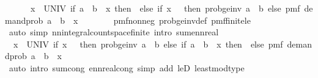 \begin{isabellebody}
\ \ \ \ \ \ {\isacharparenleft}{\kern0pt}{\isasymSum}x\ {\isasymin}\ UNIV{\isachardot}{\kern0pt}\ {\isacharparenleft}{\kern0pt}if\ a\ {\isacharplus}{\kern0pt}\ b\ {\isacharless}{\kern0pt}\ x\ then\ {}\ else\ if\ x\ {\isacharequal}{\kern0pt}\ {}\ then\ prob{\isacharunderscore}{\kern0pt}ge{\isacharunderscore}{\kern0pt}inv\ {\isacharparenleft}{\kern0pt}a\ {\isacharplus}{\kern0pt}\ b{\isacharparenright}{\kern0pt}\ else\ pmf\ demand{\isacharunderscore}{\kern0pt}prob\ {\isacharparenleft}{\kern0pt}a\ {\isacharplus}{\kern0pt}\ b\ {\isacharminus}{\kern0pt}\ x{\isacharparenright}{\kern0pt}{\isacharparenright}{\kern0pt}{\isacharparenright}{\kern0pt}{\isachardoublequoteclose}\isanewline
\ \ \ \ \ \ \isamarkupfalse%
\ pmf{\isacharunderscore}{\kern0pt}nonneg\ prob{\isacharunderscore}{\kern0pt}ge{\isacharunderscore}{\kern0pt}inv{\isacharunderscore}{\kern0pt}def\ pmf{\isacharunderscore}{\kern0pt}finite{\isacharunderscore}{\kern0pt}le\isanewline
\ \ \ \ \ \ \isamarkupfalse%
\ {\isacharparenleft}{\kern0pt}auto\ simp{\isacharcolon}{\kern0pt}\ nn{\isacharunderscore}{\kern0pt}integral{\isacharunderscore}{\kern0pt}count{\isacharunderscore}{\kern0pt}space{\isacharunderscore}{\kern0pt}finite\ intro{\isacharbang}{\kern0pt}{\isacharcolon}{\kern0pt}\ sum{\isacharunderscore}{\kern0pt}ennreal{\isacharparenright}{\kern0pt}\isanewline
\ \ \ \ \isamarkupfalse%
\ \isamarkupfalse%
\ {\isachardoublequoteopen}{\isasymdots}\ {\isacharequal}{\kern0pt}{\isacharparenleft}{\kern0pt}{\isasymSum}x\ {\isasymin}\ UNIV{\isachardot}{\kern0pt}\ {\isacharparenleft}{\kern0pt}if\ x\ {\isacharequal}{\kern0pt}\ {}\ then\ prob{\isacharunderscore}{\kern0pt}ge{\isacharunderscore}{\kern0pt}inv\ {\isacharparenleft}{\kern0pt}a\ {\isacharplus}{\kern0pt}\ b{\isacharparenright}{\kern0pt}\ else\ if\ a\ {\isacharplus}{\kern0pt}\ b\ {\isacharless}{\kern0pt}\ x\ then\ {}\ else\ pmf\ demand{\isacharunderscore}{\kern0pt}prob\ {\isacharparenleft}{\kern0pt}a\ {\isacharplus}{\kern0pt}\ b\ {\isacharminus}{\kern0pt}\ x{\isacharparenright}{\kern0pt}{\isacharparenright}{\kern0pt}{\isacharparenright}{\kern0pt}{\isachardoublequoteclose}\isanewline
\ \ \ \ \ \ \isamarkupfalse%
\ {\isacharparenleft}{\kern0pt}auto\ intro{\isacharbang}{\kern0pt}{\isacharcolon}{\kern0pt}\ sum{\isachardot}{\kern0pt}cong\ ennreal{\isacharunderscore}{\kern0pt}cong\ simp\ add{\isacharcolon}{\kern0pt}\ leD\ least{\isacharunderscore}{\kern0pt}mod{\isacharunderscore}{\kern0pt}type{\isacharparenright}{\kern0pt}\isanewline
\ \ \ \ \isamarkupfalse%

\end{isabellebody}
